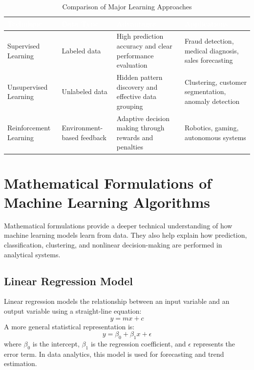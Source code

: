 \documentclass[11pt,a4paper]{article}
\begin{document}
\begin{table}[H]
\centering
\caption{Comparison of Major Learning Approaches}
\renewcommand{\arraystretch}{1.35}
\small
\begin{tabular}{>{\raggedright\arraybackslash}p{3.4cm} >{\raggedright\arraybackslash}p{3.0cm} >{\raggedright\arraybackslash}p{3.8cm} >{\raggedright\arraybackslash}p{3.8cm}}
\toprule
\rowcolor{prismblue}
\textcolor{white}{\textbf{Technique}} & \textcolor{white}{\textbf{Data Type}} & \textcolor{white}{\textbf{Advantages}} & \textcolor{white}{\textbf{Applications}} \\
\midrule
\rowcolor{prismlight}
Supervised Learning & Labeled data & High prediction accuracy and clear performance evaluation & Fraud detection, medical diagnosis, sales forecasting \\
Unsupervised Learning & Unlabeled data & Hidden pattern discovery and effective data grouping & Clustering, customer segmentation, anomaly detection \\
\rowcolor{prismlight}
Reinforcement Learning & Environment-based feedback & Adaptive decision making through rewards and penalties & Robotics, gaming, autonomous systems \\
\bottomrule
\end{tabular}
\end{table}


\section{Mathematical Formulations of Machine Learning Algorithms}

Mathematical formulations provide a deeper technical understanding of how machine learning models learn from data. They also help explain how prediction, classification, clustering, and nonlinear decision-making are performed in analytical systems.

\subsection{Linear Regression Model}

Linear regression models the relationship between an input variable and an output variable using a straight-line equation:
\[
y = mx + c
\]
A more general statistical representation is:
\[
y = \beta_0 + \beta_1 x + \epsilon
\]
where $\beta_0$ is the intercept, $\beta_1$ is the regression coefficient, and $\epsilon$ represents the error term. In data analytics, this model is used for forecasting and trend estimation.
\end{document}
